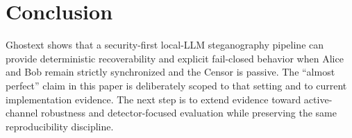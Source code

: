 \section{Conclusion}
Ghostext shows that a security-first local-LLM steganography pipeline can provide deterministic recoverability and explicit fail-closed behavior when Alice and Bob remain strictly synchronized and the Censor is passive. The ``almost perfect'' claim in this paper is deliberately scoped to that setting and to current implementation evidence. The next step is to extend evidence toward active-channel robustness and detector-focused evaluation while preserving the same reproducibility discipline.
